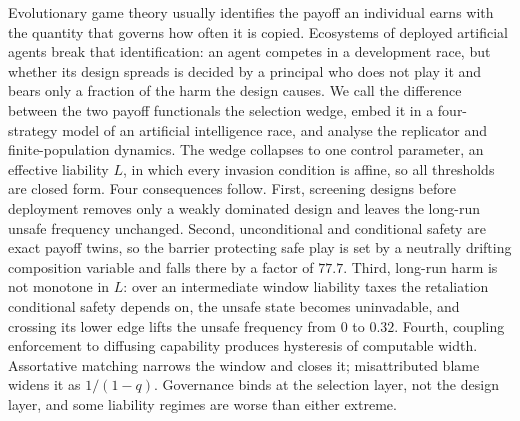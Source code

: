 \noindent
Evolutionary game theory usually identifies the payoff an individual earns with
the quantity that governs how often it is copied. Ecosystems of deployed
artificial agents break that identification: an agent competes in a development
race, but whether its design spreads is decided by a principal who does not play
it and bears only a fraction of the harm the design causes. We call the
difference between the two payoff functionals the selection wedge, embed it in a
four-strategy model of an artificial intelligence race, and analyse the
replicator and finite-population dynamics. The wedge collapses to one control
parameter, an effective liability $L$, in which every invasion condition is
affine, so all thresholds are closed form. Four consequences follow. First,
screening designs before deployment removes only a weakly dominated design and
leaves the long-run unsafe frequency unchanged. Second, unconditional and
conditional safety are exact payoff twins, so the barrier protecting safe play
is set by a neutrally drifting composition variable and falls there by a factor
of $77.7$. Third, long-run harm is not monotone in $L$: over an intermediate
window liability taxes the retaliation conditional safety depends on, the unsafe
state becomes uninvadable, and crossing its lower edge lifts the unsafe
frequency from $0$ to $0.32$. Fourth, coupling enforcement to diffusing
capability produces hysteresis of computable width. Assortative matching narrows
the window and closes it; misattributed blame widens it as $1/(1-q)$. Governance
binds at the selection layer, not the design layer, and some liability regimes
are worse than either extreme.

